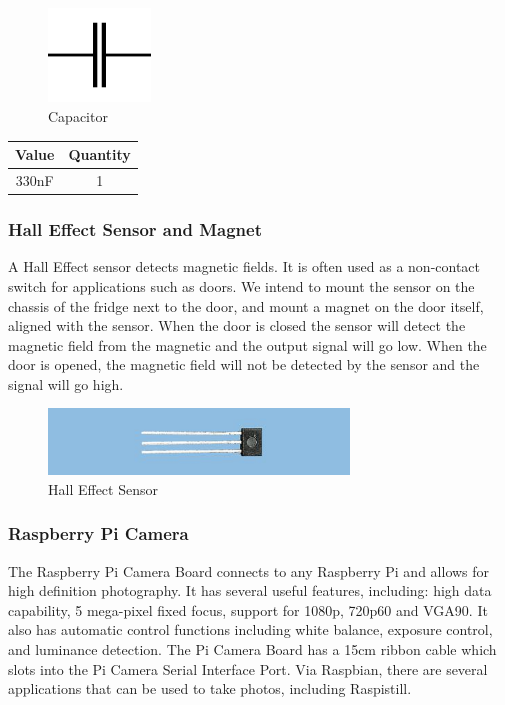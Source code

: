 \documentclass[10pt]{article}
\begin{document}
\begin{figure}[h]
\centering
\caption{Capacitor}
\label{Capacitor}
\includegraphics[height=2.5cm]{images/capacitor_diagram.jpg}
\end{figure}

\begin{center}
	\begin{tabular}{|c|c|}
		\hline
		Value & Quantity \\ \hline
		330nF & 1 \\ \hline
	\end{tabular}
\end{center}

\subsubsection{Hall Effect Sensor and Magnet}

A Hall Effect sensor detects magnetic fields. It is often used as a non-contact switch for applications such as doors. We intend to mount the sensor on the chassis of the fridge next to the door, and mount a magnet on the door itself, aligned with the sensor. When the door is closed the sensor will detect the magnetic field from the magnetic and the output signal will go low. When the door is opened, the magnetic field will not be detected by the sensor and the signal will go high.

\begin{figure}[h]
\centering
\caption{Hall Effect Sensor}
\label{Hall Effect Sensor}
\includegraphics[width=8cm]{images/hall-effect-sensor.jpg}
\end{figure}

\subsubsection{Raspberry Pi Camera}

The Raspberry Pi Camera Board connects to any Raspberry Pi and allows for high definition photography. It has several useful features, including: high data capability, 5 mega-pixel fixed focus, support for 1080p, 720p60 and VGA90. It also has automatic control functions including white balance, exposure control, and luminance detection.
The Pi Camera Board has a 15cm ribbon cable which slots into the Pi Camera Serial Interface Port. Via Raspbian, there are several applications that can be used to take photos, including Raspistill.
\end{document}
